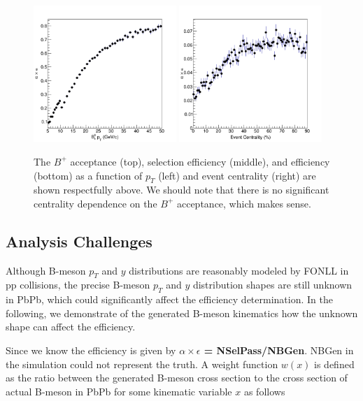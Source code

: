 \begin{figure}[h]
\begin{center}
\includegraphics[width=0.48\textwidth]{Figures/Chapter4/BPEff1DPtHis.png}
\includegraphics[width=0.48\textwidth]{Figures/Chapter4/BPEff1DCentHis.png}
\caption{The $B^+$ acceptance (top), selection efficiency (middle), and efficiency (bottom) as a function of $p_T$ (left) and event centrality (right) are shown respectfully above. We should note that there is no significant centrality dependence on the $B^+$ acceptance, which makes sense.}
\label{BPMCData}
\end{center}
\end{figure}


\subsection{Analysis Challenges}

Although B-meson $p_T$ and $y$ distributions are reasonably modeled by FONLL in pp collisions, the precise B-meson $p_T$ and $y$ distribution shapes are still unknown in PbPb, which could significantly affect the efficiency determination. In the following, we demonstrate of the generated B-meson kinematics how the unknown shape can affect the efficiency. 

Since we know the efficiency is given by \textbf{$\alpha \times \epsilon$ = NSelPass/NBGen}. NBGen in the simulation could not represent the truth. A weight function $w(x)$ is defined as the ratio between the generated B-meson cross section to the cross section of actual B-meson in PbPb for some kinematic variable $x$ as follows

